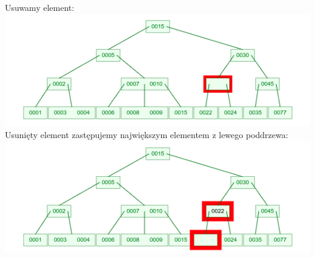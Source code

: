 \documentclass[12pt]{article}
\begin{document}
	\noindent Usuwamy element: \\
	\includegraphics[width=\linewidth]{graphics/b-trees/delete/delete.png} \\

	\noindent Usunięty element zastępujemy największym elementem z lewego poddrzewa: \\
	\includegraphics[width=\linewidth]{graphics/b-trees/delete/rebalance-01.png} \\
\end{document}
